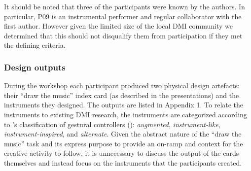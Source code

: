 \documentclass[letterpaper, 12pt]{article}
\begin{document}
It should be noted that three of the participants were known by the authors. In particular, P09 is an instrumental performer and regular collaborator with the first author. However given the limited size of the local DMI community we determined that this should not disqualify them from participation if they met the defining criteria. 

\subsubsection{Design outputs}
\label{ch3-sec:design-outputs}

During the workshop each participant produced two physical design artefacts: their ``draw the music'' index card (as described in the presentations) and the instruments they designed. The outputs are listed in Appendix 1. To relate the instruments to existing DMI research, the instruments are categorized according to \citeauthor{Miranda2006a}'s classification of gestural controllers (\citeyear{Miranda2006a}): \emph{augmented}, \emph{instrument-like}, \emph{instrument-inspired}, and \emph{alternate}. Given the abstract nature of the ``draw the music'' task and its express purpose to provide an on-ramp and context for the creative activity to follow, it is unnecessary to discuss the output of the cards themselves and instead focus on the instruments that the participants created. 

\end{document}
